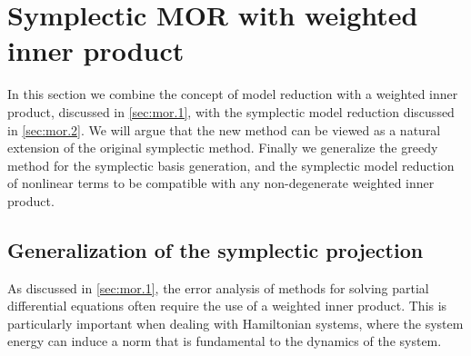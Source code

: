 \section{Symplectic MOR with weighted inner product} \label{sec:normmor}

In this section we combine the concept of model reduction with a weighted inner product, discussed in \cref{sec:mor.1}, with the symplectic model reduction discussed in \cref{sec:mor.2}. We will argue that the new method can be viewed as a natural extension of the original symplectic method. Finally we generalize the greedy method for the symplectic basis generation, and the symplectic model reduction of nonlinear terms to be compatible with any non-degenerate weighted inner product.

\subsection{Generalization of the symplectic projection} \label{sec:normmor.1}
As discussed in \cref{sec:mor.1}, the error analysis of methods for solving partial differential equations often require the use of a weighted inner product. This is particularly important when dealing with Hamiltonian systems, where the system energy can induce a norm that is fundamental to the dynamics of the system.

